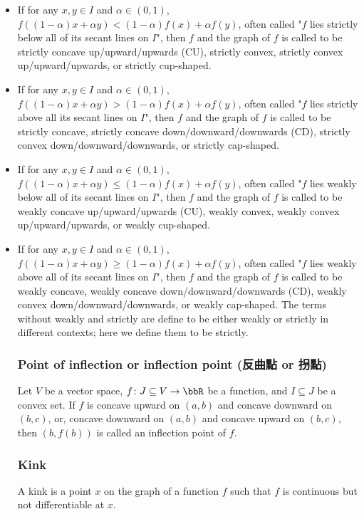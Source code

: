 \documentclass[a4paper,12pt]{report}
\begin{document}
\begin{itemize}
\begin{itemize}
\subsubsection{Concavity (凹性)}
Let $V$ be a vector space and function $f\colon J\subseteq V\to\bbR$ be continuous on a convex set $I\subseteq J$.
\bit
\item If for any $x,y\in I$ and $\alpha\in(0,1)$, $f((1-\alpha)x+\alpha y)<(1-\alpha)f(x)+\alpha f(y)$, often called "$f$ lies strictly below all of its secant lines on $I$", then $f$ and the graph of $f$ is called to be strictly concave up/upward/upwards (CU), strictly convex, strictly convex up/upward/upwards, or strictly cup-shaped.
\item If for any $x,y\in I$ and $\alpha\in(0,1)$, $f((1-\alpha)x+\alpha y)>(1-\alpha)f(x)+\alpha f(y)$, often called "$f$ lies strictly above all its secant lines on $I$", then $f$ and the graph of $f$ is called to be strictly concave, strictly concave down/downward/downwards (CD), strictly convex down/downward/downwards, or strictly cap-shaped.
\item If for any $x,y\in I$ and $\alpha\in(0,1)$, $f((1-\alpha)x+\alpha y)\leq (1-\alpha)f(x)+\alpha f(y)$, often called "$f$ lies weakly below all of its secant lines on $I$", then $f$ and the graph of $f$ is called to be weakly concave up/upward/upwards (CU), weakly convex, weakly convex up/upward/upwards, or weakly cup-shaped.
\item If for any $x,y\in I$ and $\alpha\in(0,1)$, $f((1-\alpha)x+\alpha y)\geq (1-\alpha)f(x)+\alpha f(y)$, often called "$f$ lies weakly above all of its secant lines on $I$", then $f$ and the graph of $f$ is called to be weakly concave, weakly concave down/downward/downwards (CD), weakly convex down/downward/downwards, or weakly cap-shaped.
\eit
The terms without weakly and strictly are define to be either weakly or strictly in different contexts; here we define them to be strictly.
\subsubsection{Point of inflection or inflection point (反曲點 or 拐點)}
Let $V$ be a vector space, $f\colon J\subseteq V\to\bbR$ be a function, and $I\subseteq J$ be a convex set. If $f$ is concave upward on $(a,b)$ and concave downward on $(b,c)$, or, concave downward on $(a,b)$ and concave upward on $(b,c)$, then $(b,f(b))$ is called an inflection point of $f$.
\subsubsection{Kink}
A kink is a point $x$ on the graph of a function $f$ such that $f$ is continuous but not differentiable at $x$.

\end{itemize}
\end{itemize}
\end{document}
